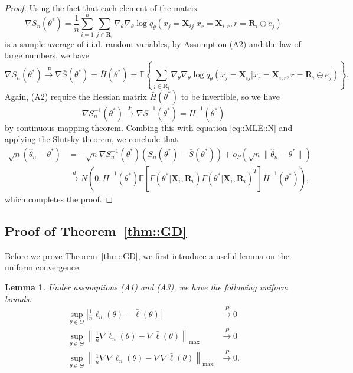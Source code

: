\documentclass[aos, preprint]{imsart}
\theoremstyle{plain}
\newtheorem{lemma}[theorem]{Lemma}
\theoremstyle{definition}
\let\hat\widehat
\newcommand{\E}{\mbox{$\mathbb{E}$}}
\newcommand{\bX}{\mathbf{X}}
\newcommand{\bR}{\mathbf{R}}
\begin{document}
\begin{appendix}
\begin{proof}
Using the fact that each element of the matrix
$$
\nabla S_n(\theta^*) = \frac{1}{n}\sum_{i=1}^n\sum_{j \in \bR_i} \nabla_\theta \nabla_\theta \log q_\theta(x_j = \bX_{ij}|x_{r} = \bX_{i, r}, r = \bR_i\ominus e_j)
$$
is a sample average of i.i.d. random variables, by Assumption (A2) and the law of large numbers, 
we have 
$$
\nabla S_n(\theta^*) \overset{P}{\rightarrow} \nabla \bar S(\theta^*)  = \bar H(\theta^*) = \E\left\{\sum_{j \in \bR_i} \nabla_\theta \nabla_\theta \log q_\theta(x_j = \bX_{ij}|x_{r} = \bX_{i, r}, r = \bR_i\ominus e_j)\right\}.
$$
Again, (A2) require the Hessian matrix $ \bar H(\theta^*)$ to be invertible, so we have 
$$
\nabla S^{-1}_n(\theta^*)\overset{P}{\rightarrow} \nabla \bar S^{-1}(\theta^*) = \bar H^{-1}(\theta^*)
$$
by continuous mapping theorem.
Combing this with equation \eqref{eq::MLE::N} and applying the Slutsky theorem, we conclude that 
\begin{align*}
\sqrt{n}(\hat \theta_n - \theta^*) &= -  \sqrt{n}\nabla S^{-1}_n(\theta^*) (S_n(\theta^*) - \bar S(\theta^*)) + o_P(\sqrt{n}\|\hat \theta_n - \theta^*\|)\\
&\overset{d}{\rightarrow}  N (0, \bar H^{-1}(\theta^*)\E\left[\Gamma(\theta^*| \bX_i, \bR_i) \Gamma(\theta^*| \bX_i, \bR_i)^T \right ]\bar H^{-1}(\theta^*)),
\end{align*}
which completes the proof. 
\end{proof}


\subsection{Proof of Theorem~\ref{thm::GD}}	\label{sec::thm::GD}

Before we prove Theorem~\ref{thm::GD}, we first introduce a useful lemma on the uniform convergence.
\begin{lemma}
Under assumptions (A1) and (A3), we have the following uniform bounds:
\begin{align*}
\sup_{\theta \in \Theta} \left|\frac{1}{n}\ell_n(\theta) - \bar \ell(\theta)\right| &\overset{P}{\rightarrow}0\\
\sup_{\theta \in \Theta} \left\|\frac{1}{n}\nabla\ell_n(\theta) - \nabla\bar \ell(\theta)\right\|_{\max} &\overset{P}{\rightarrow}0\\
\sup_{\theta \in \Theta} \left\|\frac{1}{n}\nabla\nabla\ell_n(\theta) - \nabla\nabla\bar \ell(\theta)\right\|_{\max} &\overset{P}{\rightarrow}0.
\end{align*}
\label{lem::ERM}
\end{lemma}


\end{appendix}
\end{document}
